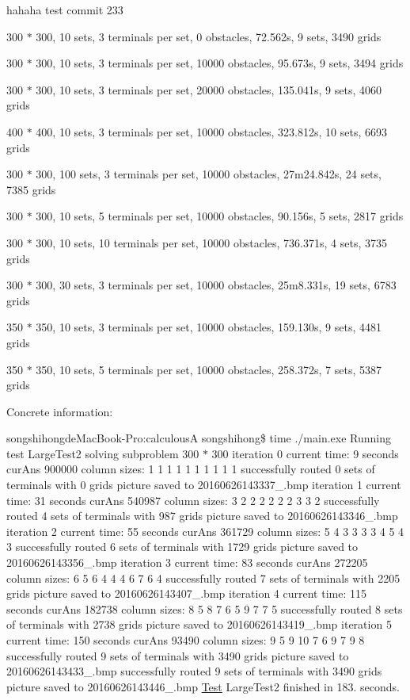 hahaha test commit 233

300 $\ast$ 300, 10 sets, 3 terminals per set, 0 obstacles, 72.\+562s, 9 sets, 3490 grids

300 $\ast$ 300, 10 sets, 3 terminals per set, 10000 obstacles, 95.\+673s, 9 sets, 3494 grids

300 $\ast$ 300, 10 sets, 3 terminals per set, 20000 obstacles, 135.\+041s, 9 sets, 4060 grids

400 $\ast$ 400, 10 sets, 3 terminals per set, 10000 obstacles, 323.\+812s, 10 sets, 6693 grids

300 $\ast$ 300, 100 sets, 3 terminals per set, 10000 obstacles, 27m24.\+842s, 24 sets, 7385 grids

300 $\ast$ 300, 10 sets, 5 terminals per set, 10000 obstacles, 90.\+156s, 5 sets, 2817 grids

300 $\ast$ 300, 10 sets, 10 terminals per set, 10000 obstacles, 736.\+371s, 4 sets, 3735 grids

300 $\ast$ 300, 30 sets, 3 terminals per set, 10000 obstacles, 25m8.\+331s, 19 sets, 6783 grids

350 $\ast$ 350, 10 sets, 3 terminals per set, 10000 obstacles, 159.\+130s, 9 sets, 4481 grids

350 $\ast$ 350, 10 sets, 5 terminals per set, 10000 obstacles, 258.\+372s, 7 sets, 5387 grids

Concrete information\+:

songshihongde\+Mac\+Book-\/\+Pro\+:calculousA songshihong\$ time ./main.exe Running test Large\+Test2 solving subproblem 300 $\ast$ 300 iteration 0 current time\+: 9 seconds cur\+Ans 900000 column sizes\+: 1 1 1 1 1 1 1 1 1 1 successfully routed 0 sets of terminals with 0 grids picture saved to 20160626143337\+\_.\+bmp iteration 1 current time\+: 31 seconds cur\+Ans 540987 column sizes\+: 3 2 2 2 2 2 2 3 3 2 successfully routed 4 sets of terminals with 987 grids picture saved to 20160626143346\+\_.\+bmp iteration 2 current time\+: 55 seconds cur\+Ans 361729 column sizes\+: 5 4 3 3 3 3 4 5 4 3 successfully routed 6 sets of terminals with 1729 grids picture saved to 20160626143356\+\_.\+bmp iteration 3 current time\+: 83 seconds cur\+Ans 272205 column sizes\+: 6 5 6 4 4 4 6 7 6 4 successfully routed 7 sets of terminals with 2205 grids picture saved to 20160626143407\+\_.\+bmp iteration 4 current time\+: 115 seconds cur\+Ans 182738 column sizes\+: 8 5 8 7 6 5 9 7 7 5 successfully routed 8 sets of terminals with 2738 grids picture saved to 20160626143419\+\_.\+bmp iteration 5 current time\+: 150 seconds cur\+Ans 93490 column sizes\+: 9 5 9 10 7 6 9 7 9 8 successfully routed 9 sets of terminals with 3490 grids picture saved to 20160626143433\+\_.\+bmp successfully routed 9 sets of terminals with 3490 grids picture saved to 20160626143446\+\_.\+bmp \hyperlink{classTest}{Test} Large\+Test2 finished in 183. seconds.

